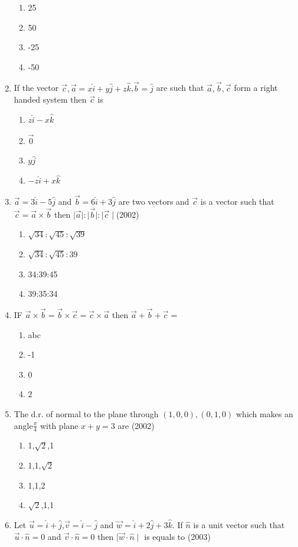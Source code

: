 \documentclass[12pt]{article}
\begin{document}
\begin{enumerate}
\begin{enumerate}
\item 25
\item 50
\item -25
\item -50
\end{enumerate}
\item If the vector $\vec{c},\vec{a}=x\hat{i}+y\hat{j}+z\hat{k}$,$\vec{b}=\hat{j}$ are such that $\vec{a},\vec{b},\vec{c}$ form a right handed system then $\vec{c}$ is
\begin{enumerate}
\item $z\hat{i}-x\hat{k}$
\item $\vec{0}$
\item $y\hat{j}$
\item $-z\hat{i}+x\hat{k}$
\end{enumerate}
\item $\vec{a}=3\hat{i}-5\hat{j}$ and $\vec{b}=6\hat{i}+3\hat{j}$ are two vectors and $\vec{c}$ is a vector such that $\vec{c}=\vec{a}\times\vec{b}$ then $\mid \vec{a}\mid:\mid \vec{b} \mid:\mid \vec{c}\mid$(2002)
\begin{enumerate}
\item $\sqrt{34}:\sqrt{45}:\sqrt{39}$
\item $\sqrt{34}:\sqrt{45}:39$
\item 34:39:45
\item 39:35:34
\end{enumerate}
\item IF $\vec{a}\times\vec{b}=\vec{b}\times\vec{c}=\vec{c}\times\vec{a}$ then $\vec{a}+\vec{b}+\vec{c}=$
\begin{enumerate}
\item abc
\item -1
\item 0
\item 2
\end{enumerate}
\item The d.r. of normal to the plane through $(1, 0, 0), (0, 1,0)$ which makes an angle$\frac{\pi}{4}$ with plane $x+y=3$ are (2002)
\begin{enumerate}
\item  1,$\sqrt{2}$,1
\item  1,1,$\sqrt{2}$
\item  1,1,2
\item  $\sqrt{2}$,1,1
\end{enumerate}
\item Let $\vec{u}=\hat{i}+\hat{j}$,$\vec{v}=\hat{i}-\hat{j}$ and $\vec{w}=\hat{i}+2\hat{j}+3\hat{k}$. If $\hat{n}$ is a unit vector such that $\vec{u}\cdot\hat{n}=0$ and  $\vec{v}\cdot\hat{n}=0$ then $\mid \vec{w}\cdot\hat{n}\mid$ is equals to (2003)

\end{enumerate}
\end{document}
